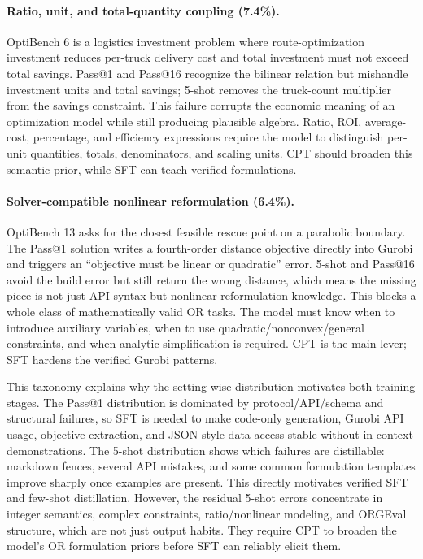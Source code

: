 \paragraph{Ratio, unit, and total-quantity coupling (7.4\%).}
OptiBench 6 is a logistics investment problem where route-optimization
investment reduces per-truck delivery cost and total investment must not exceed
total savings. Pass@1 and Pass@16 recognize the bilinear relation but mishandle
investment units and total savings; 5-shot removes the truck-count multiplier
from the savings constraint. This failure corrupts the economic meaning of an
optimization model while still producing plausible algebra. Ratio, ROI,
average-cost, percentage, and efficiency expressions require the model to
distinguish per-unit quantities, totals, denominators, and scaling units. CPT
should broaden this semantic prior, while SFT can teach verified formulations.

\paragraph{Solver-compatible nonlinear reformulation (6.4\%).}
OptiBench 13 asks for the closest feasible rescue point on a parabolic
boundary. The Pass@1 solution writes a fourth-order distance objective directly
into Gurobi and triggers an ``objective must be linear or quadratic'' error.
5-shot and Pass@16 avoid the build error but still return the wrong distance,
which means the missing piece is not just API syntax but nonlinear
reformulation knowledge. This blocks a whole class of mathematically valid OR
tasks. The model must know when to introduce auxiliary variables, when to use
quadratic/nonconvex/general constraints, and when analytic simplification is
required. CPT is the main lever; SFT hardens the verified Gurobi patterns.

This taxonomy explains why the setting-wise distribution motivates both
training stages. The Pass@1 distribution is dominated by protocol/API/schema
and structural failures, so SFT is needed to make code-only generation, Gurobi
API usage, objective extraction, and JSON-style data access stable without
in-context demonstrations. The 5-shot distribution shows which failures are
distillable: markdown fences, several API mistakes, and some common
formulation templates improve sharply once examples are present. This directly
motivates verified SFT and few-shot distillation. However, the residual
5-shot errors concentrate in integer semantics, complex constraints,
ratio/nonlinear modeling, and ORGEval structure, which are not just output
habits. They require CPT to broaden the model's OR formulation priors before
SFT can reliably elicit them.

